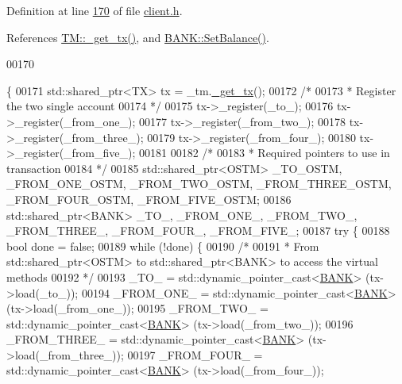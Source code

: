 Definition at line \hyperlink{client_8h_source_l00170}{170} of file \hyperlink{client_8h_source}{client.\+h}.



References \hyperlink{_t_m_8cpp_source_l00079}{T\+M\+::\+\_\+get\+\_\+tx()}, and \hyperlink{_b_a_n_k_8h_source_l00046}{B\+A\+N\+K\+::\+Set\+Balance()}.


\begin{DoxyCode}
00170                                                                                                            
                                                                                                                  
                                  \{
00171     std::shared\_ptr<TX> tx = \_tm.\hyperlink{class_t_m_a41cb0226cc4080c931651b13f74a0075_a41cb0226cc4080c931651b13f74a0075}{\_get\_tx}();
00172     \textcolor{comment}{/*}
00173 \textcolor{comment}{     * Register the two single account}
00174 \textcolor{comment}{     */}
00175     tx->\_register(\_to\_);
00176     tx->\_register(\_from\_one\_);
00177     tx->\_register(\_from\_two\_);
00178     tx->\_register(\_from\_three\_);
00179     tx->\_register(\_from\_four\_);
00180     tx->\_register(\_from\_five\_);
00181 
00182     \textcolor{comment}{/*}
00183 \textcolor{comment}{     * Required pointers to use in transaction}
00184 \textcolor{comment}{     */}
00185     std::shared\_ptr<OSTM> \_TO\_OSTM, \_FROM\_ONE\_OSTM, \_FROM\_TWO\_OSTM, \_FROM\_THREE\_OSTM, \_FROM\_FOUR\_OSTM, 
      \_FROM\_FIVE\_OSTM;
00186     std::shared\_ptr<BANK> \_TO\_, \_FROM\_ONE\_, \_FROM\_TWO\_, \_FROM\_THREE\_, \_FROM\_FOUR\_, \_FROM\_FIVE\_;
00187     \textcolor{keywordflow}{try} \{
00188         \textcolor{keywordtype}{bool} done = \textcolor{keyword}{false};
00189         \textcolor{keywordflow}{while} (!done) \{
00190             \textcolor{comment}{/*}
00191 \textcolor{comment}{             * From std::shared\_ptr<OSTM> to std::shared\_ptr<BANK> to access the virtual methods}
00192 \textcolor{comment}{             */}
00193             \_TO\_ = std::dynamic\_pointer\_cast<\hyperlink{class_b_a_n_k}{BANK}> (tx->load(\_to\_));
00194             \_FROM\_ONE\_ = std::dynamic\_pointer\_cast<\hyperlink{class_b_a_n_k}{BANK}> (tx->load(\_from\_one\_));
00195             \_FROM\_TWO\_ = std::dynamic\_pointer\_cast<\hyperlink{class_b_a_n_k}{BANK}> (tx->load(\_from\_two\_));
00196             \_FROM\_THREE\_ = std::dynamic\_pointer\_cast<\hyperlink{class_b_a_n_k}{BANK}> (tx->load(\_from\_three\_));
00197             \_FROM\_FOUR\_ = std::dynamic\_pointer\_cast<\hyperlink{class_b_a_n_k}{BANK}> (tx->load(\_from\_four\_));

\end{DoxyCode}
